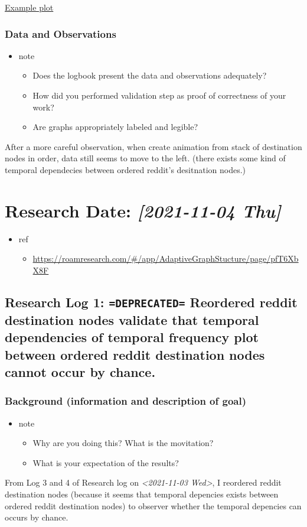 \documentclass[11pt]{article}
\begin{document}
\href{file:///mnt/c/Users/terng/OneDrive/Documents/Working/tgn/plot/1636130908.7385356-destination=1.png}{Example plot}

\subsubsection{Data and Observations}
\label{sec:orgf001514}
\begin{itemize}
\item note
\begin{itemize}
\item Does the logbook present the data and observations adequately?
\item How did you performed validation step as proof of correctness of your work?
\item Are graphs appropriately labeled and legible?
\end{itemize}
\end{itemize}

After a more careful observation, when create animation from stack of destination nodes in order, data still seems to move to the left. (there exists some kind of temporal dependecies between ordered reddit's desitnation nodes.)


\section{Research Date: \textit{[2021-11-04 Thu]}}
\label{sec:orgd5f68e3}
\begin{itemize}
\item ref
\begin{itemize}
\item \url{https://roamresearch.com/\#/app/AdaptiveGraphStucture/page/pfT6XbX8F}
\end{itemize}
\end{itemize}
\subsection{Research Log 1: \texttt{=DEPRECATED=} Reordered reddit destination nodes validate that temporal dependencies of temporal frequency plot between ordered reddit destination nodes cannot occur by chance.}
\label{sec:org56f2487}
\subsubsection{Background (information and description of goal)}
\label{sec:org5da9af8}
\begin{itemize}
\item note
\begin{itemize}
\item Why are you doing this? What is the movitation?
\item What is your expectation of the results?
\end{itemize}
\end{itemize}
From Log 3 and 4 of Research log on \textit{<2021-11-03 Wed>}, I reordered reddit destination nodes (because it seems that temporal depencies exists between ordered reddit destination nodes) to observer whether the temporal depencies can occurs by chance.
\end{document}
